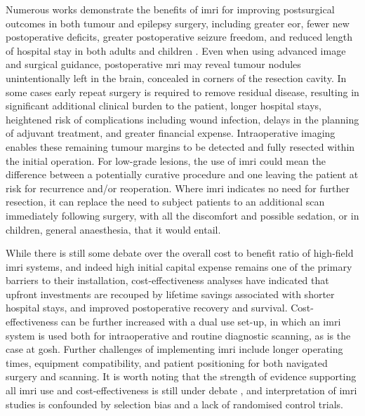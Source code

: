 Numerous works demonstrate the benefits of \gls{imri} for improving postsurgical outcomes in both tumour and epilepsy surgery, including greater \gls{eor}, fewer new postoperative deficits, greater postoperative seizure freedom, and reduced length of hospital stay in both adults and children
\autocite{Shah2012,Zhang2015a,Sacino2016,Rao2017c,Giordano2017,Lu2018a,Garzon-Muvdi2019,Leroy2019,Karsy2019,Golub2020,Hlavac2020,Englman2021}.
Even when using advanced image and surgical guidance, postoperative \gls{mri} may reveal tumour nodules unintentionally left in the brain, concealed in corners of the resection cavity.
In some cases early repeat surgery is required to remove residual disease, resulting in significant additional clinical burden to the patient, longer hospital stays, heightened risk of complications including wound infection\autocite{Tenney1985,Chang2003}, delays in the planning of adjuvant treatment, and greater financial expense\autocite{Shah2012}.
Intraoperative imaging enables these remaining tumour margins to be detected and fully resected within the initial operation\autocite{Sattur2019,Hlavac2020}.
For low-grade lesions, the use of \gls{imri} could mean the difference between a potentially curative procedure and one leaving the patient at risk for recurrence and/or reoperation\autocite{Shah2012}.
Where \gls{imri} indicates no need for further resection, it can replace the need to subject patients to an additional scan immediately following surgery, with all the discomfort and possible sedation, or in children, general anaesthesia, that it would entail.

While there is still some debate over the overall cost to benefit ratio of high-field \gls{imri} systems\autocite{Eljamel2016,Giordano2016a,Giussani2022}, and indeed high initial capital expense remains one of the primary barriers to their installation\autocite{NICE2021}, cost-effectiveness analyses have indicated that upfront investments are recouped by lifetime savings associated with shorter hospital stays, and improved postoperative recovery and survival\autocite{Giordano2016a,Sacino2018}.
Cost-effectiveness can be further increased with a dual use set-up, in which an \gls{imri} system is used both for intraoperative and routine diagnostic scanning\autocite{Giordano2016a}, as is the case at \gls{gosh}.
Further challenges of implementing \gls{imri} include longer operating times, equipment compatibility, and patient positioning for both navigated surgery and scanning\autocite{Giordano2017}.
It is worth noting that the strength of evidence supporting all \gls{imri} use and cost-effectiveness is still under debate \autocite{Jenkinson2018,Garzon-Muvdi2019,Caras2020}, and interpretation of \gls{imri} studies is confounded by selection bias and a lack of randomised control trials\autocite{Kubben2011}.

